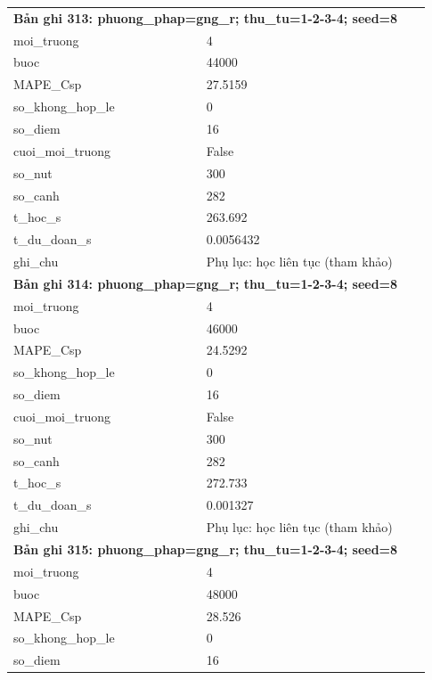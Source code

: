 \begin{longtable}{p{0.43\linewidth}p{0.50\linewidth}}
\midrule
\multicolumn{2}{p{0.95\linewidth}}{\textbf{Bản ghi 313: phuong\_phap=gng\_r; thu\_tu=1-2-3-4; seed=8}} \\
moi\_\allowbreak truong & 4 \\
buoc & 44000 \\
MAPE\_\allowbreak Csp & 27.5159 \\
so\_\allowbreak khong\_\allowbreak hop\_\allowbreak le & 0 \\
so\_\allowbreak diem & 16 \\
cuoi\_\allowbreak moi\_\allowbreak truong & False \\
so\_\allowbreak nut & 300 \\
so\_\allowbreak canh & 282 \\
t\_\allowbreak hoc\_\allowbreak s & 263.692 \\
t\_\allowbreak du\_\allowbreak doan\_\allowbreak s & 0.0056432 \\
ghi\_\allowbreak chu & Phụ lục: học liên tục (tham khảo) \\
\midrule
\multicolumn{2}{p{0.95\linewidth}}{\textbf{Bản ghi 314: phuong\_phap=gng\_r; thu\_tu=1-2-3-4; seed=8}} \\
moi\_\allowbreak truong & 4 \\
buoc & 46000 \\
MAPE\_\allowbreak Csp & 24.5292 \\
so\_\allowbreak khong\_\allowbreak hop\_\allowbreak le & 0 \\
so\_\allowbreak diem & 16 \\
cuoi\_\allowbreak moi\_\allowbreak truong & False \\
so\_\allowbreak nut & 300 \\
so\_\allowbreak canh & 282 \\
t\_\allowbreak hoc\_\allowbreak s & 272.733 \\
t\_\allowbreak du\_\allowbreak doan\_\allowbreak s & 0.001327 \\
ghi\_\allowbreak chu & Phụ lục: học liên tục (tham khảo) \\
\midrule
\multicolumn{2}{p{0.95\linewidth}}{\textbf{Bản ghi 315: phuong\_phap=gng\_r; thu\_tu=1-2-3-4; seed=8}} \\
moi\_\allowbreak truong & 4 \\
buoc & 48000 \\
MAPE\_\allowbreak Csp & 28.526 \\
so\_\allowbreak khong\_\allowbreak hop\_\allowbreak le & 0 \\
so\_\allowbreak diem & 16 \\

\end{longtable}
